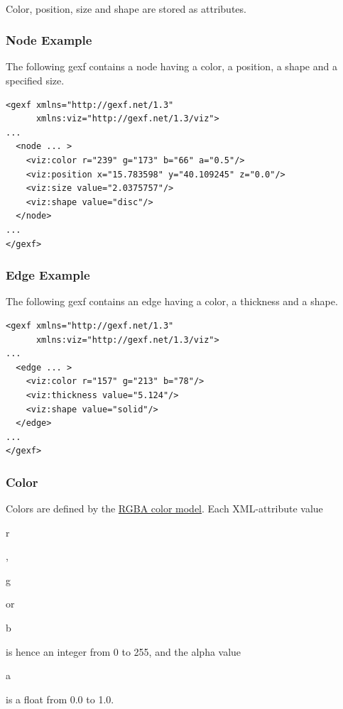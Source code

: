 \documentclass[a4paper,10pt]{article}
\begin{document}
\paragraph{}
Color, position, size and shape are stored as attributes.

\subsubsection{Node Example}

The following gexf contains a node having a color, a position, a shape and a specified size.

\lstset{ style=gexf }
\begin{lstlisting}[caption={VIZ Attributes},label=vizattr]
<gexf xmlns="http://gexf.net/1.3"
      xmlns:viz="http://gexf.net/1.3/viz">
...
  <node ... >
    <viz:color r="239" g="173" b="66" a="0.5"/>
    <viz:position x="15.783598" y="40.109245" z="0.0"/>
    <viz:size value="2.0375757"/>
    <viz:shape value="disc"/>
  </node>
...
</gexf>
\end{lstlisting}

\subsubsection{Edge Example}

The following gexf contains an edge having a color, a thickness and a shape.

\lstset{ style=gexf }
\begin{lstlisting}[caption={VIZ Attributes},label=vizattr]
<gexf xmlns="http://gexf.net/1.3"
      xmlns:viz="http://gexf.net/1.3/viz">
...
  <edge ... >
    <viz:color r="157" g="213" b="78"/>
    <viz:thickness value="5.124"/>
    <viz:shape value="solid"/>
  </edge>
...
</gexf>
\end{lstlisting}

\subsubsection{Color}

Colors are defined by the \href{http://en.wikipedia.org/wiki/RGBA}{RGBA color model}. Each XML-attribute value \begin{footnotesize}r\end{footnotesize}, \begin{footnotesize}g\end{footnotesize} or \begin{footnotesize}b\end{footnotesize} is hence an integer from 0 to 255, and the alpha value \begin{footnotesize}a\end{footnotesize} is a float from 0.0 to 1.0.
\end{document}
